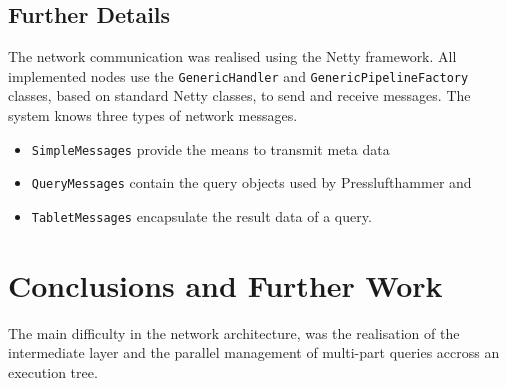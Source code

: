   \subsection{Further Details}
    The network communication was realised using the Netty framework.
    All implemented nodes use the \texttt{GenericHandler} and
    \texttt{GenericPipelineFactory} classes, based on standard Netty classes,
    to send and receive messages.
    The system knows three types of network messages.
    \begin{itemize}
      \item \texttt{SimpleMessages} provide the means to transmit meta data
      \item \texttt{QueryMessages} contain the query objects used by
        Presslufthammer and
      \item \texttt{TabletMessages} encapsulate the result data of a query.
    \end{itemize}



\section{Conclusions and Further Work}
  The main difficulty in the network architecture, was the realisation of
  the intermediate layer and the parallel management of multi-part queries
  accross an execution tree.

